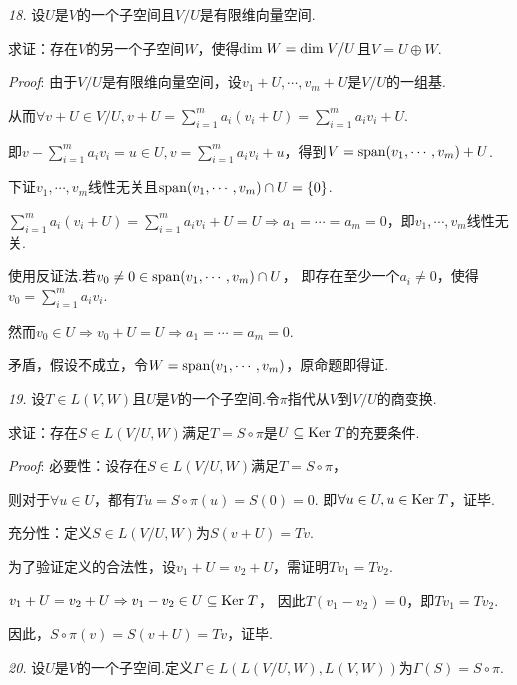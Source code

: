 \newpage

\textit{18.}
设\(U\)是\(V\)的一个子空间且\(V/U\)是有限维向量空间.

求证：存在\(V\)的另一个子空间\(W\)，使得\(\mathrm{dim \;} W=\mathrm{dim \;} V/U\)且\(V=U \oplus W\).

\textit{Proof}:
由于\(V/U\)是有限维向量空间，设\(v_1+U,\cdots,v_m+U\)是\(V/U\)的一组基.

从而\(\forall v+U \in V/U,v+U=\sum_{i=1}^m a_i(v_i+U)=\sum_{i=1}^m a_iv_i+U\).

即\(v-\sum_{i=1}^m a_iv_i=u \in U,v=\sum_{i=1}^m a_iv_i+u\)，得到\(V=\mathrm{span} (v_1,\cdots,v_m)+U\).

下证\(v_1,\cdots,v_m\)线性无关且\(\mathrm{span} (v_1,\cdots,v_m) \cap U =\{0\}\).

\(\sum_{i=1}^m a_i(v_i+U)=\sum_{i=1}^m a_iv_i+U=U \Rightarrow a_1=\cdots=a_m=0\)，即\(v_1,\cdots,v_m\)线性无关.

使用反证法.若\(v_0 \ne 0 \in \mathrm{span} (v_1,\cdots,v_m) \cap U\)，
即存在至少一个\(a_i \ne 0\)，使得\(v_0=\sum_{i=1}^m a_iv_i\).

然而\(v_0 \in U \Rightarrow v_0+U=U \Rightarrow a_1=\cdots=a_m=0\).

矛盾，假设不成立，令\(W=\mathrm{span} (v_1,\cdots,v_m)\)，原命题即得证.

\hspace*{\fill}

\textit{19.}
设\(T \in L(V,W)\)且\(U\)是\(V\)的一个子空间.令\(\pi\)指代从\(V\)到\(V/U\)的商变换.

求证：存在\(S \in L(V/U,W)\)满足\(T=S \circ \pi\)是\(U \subseteq \mathrm{Ker \;} T\)的充要条件.

\textit{Proof}:
必要性：设存在\(S \in L(V/U,W)\)满足\(T=S \circ \pi\)，

则对于\(\forall u \in U\)，都有\(Tu=S \circ \pi(u)=S(0)=0\).
即\(\forall u \in U,u \in \mathrm{Ker \;} T\)，证毕.

充分性：定义\(S \in L(V/U,W)\)为\(S(v+U)=Tv\).

为了验证定义的合法性，设\(v_1+U=v_2+U\)，需证明\(Tv_1=Tv_2\).

\(v_1+U=v_2+U \Rightarrow v_1-v_2 \in U \subseteq \mathrm{Ker \;} T\)，
因此\(T(v_1-v_2)=0\)，即\(Tv_1=Tv_2\).

因此，\(S \circ \pi(v)=S(v+U)=Tv\)，证毕.

\hspace*{\fill}

\textit{20.}
设\(U\)是\(V\)的一个子空间.定义\(\Gamma \in L(L(V/U,W),L(V,W))\)为\(\Gamma(S)=S \circ \pi\).

